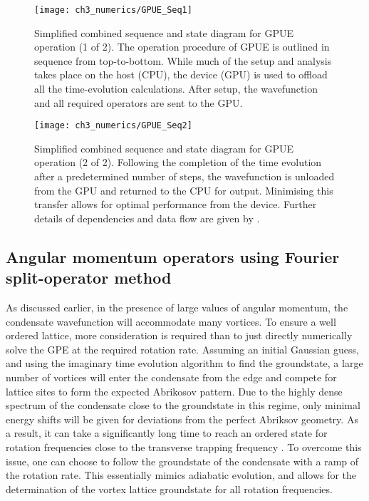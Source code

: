 \begin{figure}[]
    \centering
        \texttt{[image: ch3\_numerics/GPUE\_Seq1]}
    \caption{Simplified combined sequence and state diagram for GPUE operation (1 of 2). The operation procedure of GPUE is outlined in sequence from top-to-bottom. While much of the setup and analysis takes place on the host (CPU), the device (GPU) is used to offload all the time-evolution calculations. After setup, the wavefunction and all required operators are sent to the GPU.}
    \label{fig:gpue_seq1}
\end{figure}
\begin{figure}[]
    \centering
        \texttt{[image: ch3\_numerics/GPUE\_Seq2]}
    \caption{Simplified combined sequence and state diagram for GPUE operation (2 of 2). Following the completion of the time evolution after a predetermined number of steps, the wavefunction is unloaded from the GPU and returned to the CPU for output. Minimising this transfer allows for optimal performance from the device. Further details of dependencies and data flow are given by \cite[docs/gpue.pdf]{MLXD_GPUE}.}
    \label{fig:gpue_seq2}
\end{figure}

\subsection{Angular momentum operators using Fourier split-operator  method}\label{ss:ang_mom_fso}
As discussed earlier, in the presence of large values of angular momentum, the condensate wavefunction will accommodate many vortices. To ensure a well ordered lattice, more consideration is required than to just directly numerically solve the GPE at the required rotation rate. Assuming an initial Gaussian guess, and using the imaginary time evolution algorithm to find the groundstate, a large number of vortices will enter the condensate from the edge and compete for lattice sites to form the expected Abrikosov pattern. Due to the highly dense spectrum of the condensate close to the groundstate in this regime, only minimal energy shifts will be given for deviations from the perfect Abriksov geometry. As a result, it can take a significantly long time to reach an ordered state for rotation frequencies close to the transverse trapping frequency \cite{Vtx:Mueller_prl_2002}. To overcome this issue, one can choose to follow the groundstate of the condensate with a ramp of the rotation rate. This essentially mimics adiabatic evolution, and allows for the determination of the vortex lattice groundstate for all rotation frequencies.

